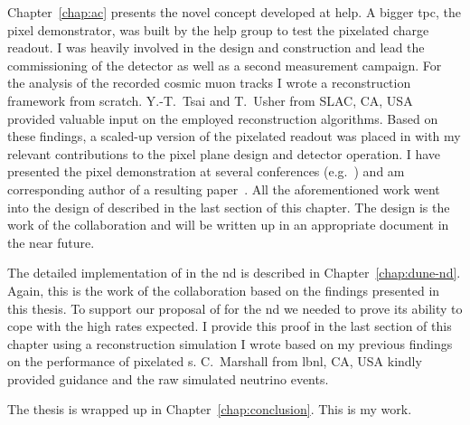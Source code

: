 Chapter~\ref{chap:ac} presents the novel \AC{} \lartpc{} concept developed at \gls{help}.
A bigger \gls{tpc}, the pixel demonstrator, was built by the \gls{help} \lar{} group to test the pixelated charge readout.
I was heavily involved in the design and construction and lead the commissioning of the detector as well as a second measurement campaign.
For the analysis of the recorded cosmic muon tracks I wrote a reconstruction framework from scratch.
Y.-T.\ Tsai and T.\ Usher from SLAC, CA, USA provided valuable input on the employed reconstruction algorithms.
Based on these findings, a scaled-up version of the pixelated readout was placed in \lariat{} with my relevant contributions to the pixel plane design and detector operation.
I have presented the pixel demonstration at several conferences (e.g.~\cite{pixel_proceedings}) and am corresponding author of a resulting paper~\cite{pixel_paper}.
All the aforementioned work went into the design of \AC{} described in the last section of this chapter.
The design is the work of the \AC{} collaboration and will be written up in an appropriate document in the near future.

The detailed implementation of \AC{} in the \dune{} \gls{nd} is described in Chapter~\ref{chap:dune-nd}.
Again, this is the work of the \AC{} collaboration based on the findings presented in this thesis.
To support our proposal of \AC{} for the \dune{} \gls{nd} we needed to prove its ability to cope with the high rates expected.
I provide this proof in the last section of this chapter using a reconstruction simulation I wrote based on my previous findings on the performance of pixelated \lartpc{}s.
C.\ Marshall from \gls{lbnl}, CA, USA kindly provided guidance and the raw simulated neutrino events.

The thesis is wrapped up in Chapter~\ref{chap:conclusion}.
This is my work.
